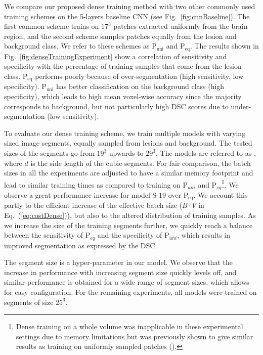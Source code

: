 

We compare our proposed dense training method with two other commonly used training schemes on the 5-layers baseline CNN (see Fig.~\ref{fig:cnnBaseline}). The first common scheme trains on $17^3$ patches extracted uniformly from the brain region, and the second scheme samples patches equally from the lesion and background class. We refer to these schemes as P$_\text{uni}$ and P$_\text{eq}$. The results shown in Fig.~\ref{fig:denseTrainingExperiment} show a correlation of sensitivity and specificity with the percentage of training samples that come from the lesion class. P$_\text{eq}$ performs poorly because of over-segmentation (high sensitivity, low specificity). P$_\text{uni}$ has better classification on the background class (high specificity), which leads to high mean voxel-wise accuracy since the majority corresponds to background, but not particularly high DSC scores due to under-segmentation (low sensitivity).

To evaluate our dense training scheme, we train multiple models with varying sized image segments, equally sampled from lesions and background. The tested sizes of the segments go from $19^3$ upwards to $29^3$. The models are referred to as , where $d$ is the side length of the cubic segments. For fair comparison, the batch sizes in all the experiments are adjusted to have a similar memory footprint and lead to similar training times as compared to training on P$_{uni}$ and P$_{eq}$\footnote{Dense training on a whole volume was inapplicable in these experimental settings due to memory limitations but was previously shown to give similar results as training on uniformly sampled patches (\cite{Long2014}).}. We observe a great performance increase for model S-${19}$ over P$_\text{eq}$. We account this partly to the efficient increase of the effective batch size ($B \cdot V$ in Eq.~(\ref{eq:costDense})), but also to the altered distribution of training samples. As we increase the size of the training segments further, we quickly reach a balance between the sensitivity of P$_{eq}$ and the specificity of P$_{uni}$, which results in improved segmentation as expressed by the DSC.

The segment size is a hyper-parameter in our model. We observe that the increase in performance with increasing segment size quickly levels off, and similar performance is obtained for a wide range of segment sizes, which allows for easy configuration. For the remaining experiments, all models were trained on segments of size $25^3$.


